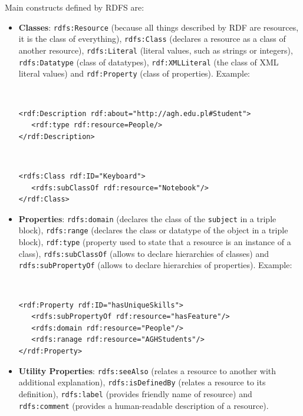 \noindent Main constructs defined by RDFS are:
\begin{itemize}
    \setlength{\itemsep}{0cm}
    \setlength{\parskip}{0cm}

    \item \textbf{Classes}: \texttt{rdfs:Resource} (because all things described by RDF are resources, it is the class of everything), \texttt{rdfs:Class} (declares a resource as a class of another resource), \texttt{rdfs:Literal} (literal values, such as strings or integers), \texttt{rdfs:Datatype} (class of datatypes), \texttt{rdf:XMLLiteral} (the class of XML literal values) and \texttt{rdf:Property} (class of properties). Example:

{\tt \small
\begin{verbatim}
<rdf:Description rdf:about="http://agh.edu.pl#Student">
   <rdf:type rdf:resource=People/>
</rdf:Description>
\end{verbatim}
}

{\tt \small
\begin{verbatim}
<rdfs:Class rdf:ID="Keyboard">
   <rdfs:subClassOf rdf:resource="Notebook"/>
</rdf:Class>
\end{verbatim}
}

    \item \textbf{Properties}: \texttt{rdfs:domain} (declares the class of the \texttt{subject} in a triple block), \texttt{rdfs:range} (declares the class or datatype of the object in a triple block), \texttt{rdf:type} (property used to state that a resource is an instance of a class), \texttt{rdfs:subClassOf} (allows to declare hierarchies of classes) and \texttt{rdfs:subPropertyOf} (allows to declare hierarchies of properties). Example:

{\tt \small
\begin{verbatim}
<rdf:Property rdf:ID="hasUniqueSkills">
   <rdfs:subPropertyOf rdf:resource="hasFeature"/>
   <rdfs:domain rdf:resource="People"/>
   <rdfs:ranage rdf:resource="AGHStudents"/>
</rdf:Property>
\end{verbatim}
}

    \item \textbf{Utility Properties}: \texttt{rdfs:seeAlso} (relates a resource to another with additional explanation), \texttt{rdfs:isDefinedBy} (relates a resource to its definition), \texttt{rdfs:label} (provides friendly name of resource) and \texttt{rdfs:comment} (provides a human-readable description of a resource).
\end{itemize}

